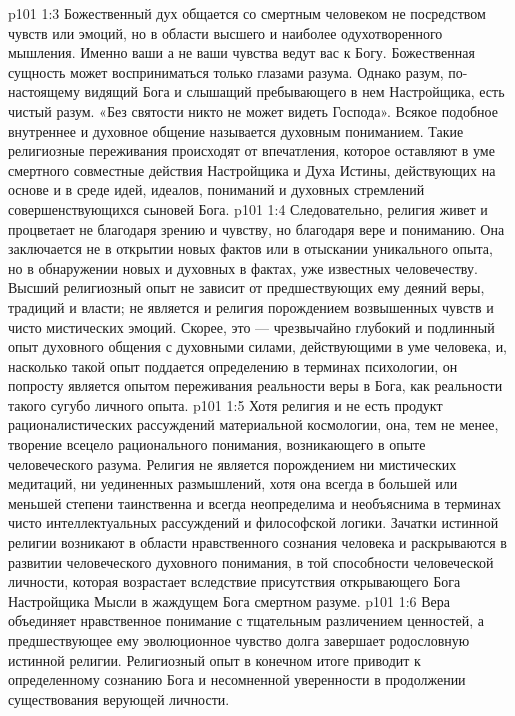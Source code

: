 \vs p101 1:3 Божественный дух общается со смертным человеком не посредством чувств или эмоций, но в области высшего и наиболее одухотворенного мышления. Именно ваши  а не ваши чувства ведут вас к Богу. Божественная сущность может восприниматься только глазами разума. Однако разум, по\hyp{}настоящему видящий Бога и слышащий пребывающего в нем Настройщика, есть чистый разум. «Без святости никто не может видеть Господа». Всякое подобное внутреннее и духовное общение называется духовным пониманием. Такие религиозные переживания происходят от впечатления, которое оставляют в уме смертного совместные действия Настройщика и Духа Истины, действующих на основе и в среде идей, идеалов, пониманий и духовных стремлений совершенствующихся сыновей Бога.
\vs p101 1:4 Следовательно, религия живет и процветает не благодаря зрению и чувству, но благодаря вере и пониманию. Она заключается не в открытии новых фактов или в отыскании уникального опыта, но в обнаружении новых и духовных  в фактах, уже известных человечеству. Высший религиозный опыт не зависит от предшествующих ему деяний веры, традиций и власти; не является и религия порождением возвышенных чувств и чисто мистических эмоций. Скорее, это --- чрезвычайно глубокий и подлинный опыт духовного общения с духовными силами, действующими в уме человека, и, насколько такой опыт поддается определению в терминах психологии, он попросту является опытом переживания реальности веры в Бога, как реальности такого сугубо личного опыта.
\vs p101 1:5 \pc Хотя религия и не есть продукт рационалистических рассуждений материальной космологии, она, тем не менее, творение всецело рационального понимания, возникающего в опыте человеческого разума. Религия не является порождением ни мистических медитаций, ни уединенных размышлений, хотя она всегда в большей или меньшей степени таинственна и всегда неопределима и необъяснима в терминах чисто интеллектуальных рассуждений и философской логики. Зачатки истинной религии возникают в области нравственного сознания человека и раскрываются в развитии человеческого духовного понимания, в той способности человеческой личности, которая возрастает вследствие присутствия открывающего Бога Настройщика Мысли в жаждущем Бога смертном разуме.
\vs p101 1:6 Вера объединяет нравственное понимание с тщательным различением ценностей, а предшествующее ему эволюционное чувство долга завершает родословную истинной религии. Религиозный опыт в конечном итоге приводит к определенному сознанию Бога и несомненной уверенности в продолжении существования верующей личности.
